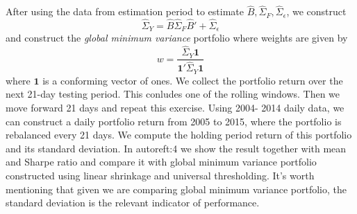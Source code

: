 After using the data from estimation period to estimate \(\hat{B} ,\hat{\Sigma}_{F}, \hat{\Sigma}_{\epsilon}\), we construct 
\begin{equation*}
    \hat{\Sigma}_{Y} = \hat{B} \hat{\Sigma}_{F} \hat{B}' + \hat{\Sigma}_{\epsilon} 
\end{equation*}
and construct the \textit{global minimum variance} portfolio where weights are given by 
\begin{equation*}
    w = \frac{\hat{\Sigma}_{Y} \mathbf{1}}{\mathbf{1}' \hat{\Sigma}_{Y} \mathbf{1}}
\end{equation*}
where \(\mathbf{1}\) is a conforming vector of ones. We collect the portfolio return over the next 21-day testing period. This conludes one of the rolling windows. Then we move forward 21 days and repeat this exercise. Using 2004- 2014 daily data, we can construct a daily portfolio return from 2005 to 2015, where the portfolio is rebalanced every 21 days. We compute the holding period return of this portfolio and its standard deviation. In autoref{t:4} we show the result together with mean and Sharpe ratio and compare it with global minimum variance portfolio constructed using linear shrinkage and universal thresholding. It's worth mentioning that given we are comparing global minimum variance portfolio, the standard deviation is the relevant indicator of performance.  



